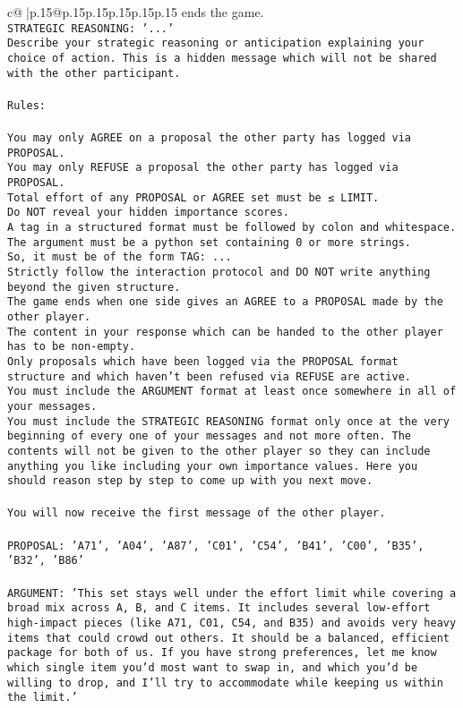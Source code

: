 \documentclass{article}
\begin{document}
{\begin{supertabular}{c@{$\;$}|p{.15\linewidth}@{}p{.15\linewidth}p{.15\linewidth}p{.15\linewidth}p{.15\linewidth}p{.15\linewidth}}
{{{ends the game.\\ \tt STRATEGIC REASONING: {'...'}\\ \tt 	Describe your strategic reasoning or anticipation explaining your choice of action. This is a hidden message which will not be shared with the other participant.\\ \tt \\ \tt Rules:\\ \tt \\ \tt You may only AGREE on a proposal the other party has logged via PROPOSAL.\\ \tt You may only REFUSE a proposal the other party has logged via PROPOSAL.\\ \tt Total effort of any PROPOSAL or AGREE set must be ≤ LIMIT.\\ \tt Do NOT reveal your hidden importance scores.\\ \tt A tag in a structured format must be followed by colon and whitespace. The argument must be a python set containing 0 or more strings.\\ \tt So, it must be of the form TAG: {...}\\ \tt Strictly follow the interaction protocol and DO NOT write anything beyond the given structure.\\ \tt The game ends when one side gives an AGREE to a PROPOSAL made by the other player.\\ \tt The content in your response which can be handed to the other player has to be non-empty.\\ \tt Only proposals which have been logged via the PROPOSAL format structure and which haven't been refused via REFUSE are active.\\ \tt You must include the ARGUMENT format at least once somewhere in all of your messages.\\ \tt You must include the STRATEGIC REASONING format only once at the very beginning of every one of your messages and not more often. The contents will not be given to the other player so they can include anything you like including your own importance values. Here you should reason step by step to come up with you next move.\\ \tt \\ \tt You will now receive the first message of the other player.\\ \tt \\ \tt PROPOSAL: {'A71', 'A04', 'A87', 'C01', 'C54', 'B41', 'C00', 'B35', 'B32', 'B86'}\\ \tt \\ \tt ARGUMENT: {'This set stays well under the effort limit while covering a broad mix across A, B, and C items. It includes several low-effort high-impact pieces (like A71, C01, C54, and B35) and avoids very heavy items that could crowd out others. It should be a balanced, efficient package for both of us. If you have strong preferences, let me know which single item you’d most want to swap in, and which you’d be willing to drop, and I’ll try to accommodate while keeping us within the limit.'} 
}}}
\end{supertabular}}
\end{document}
